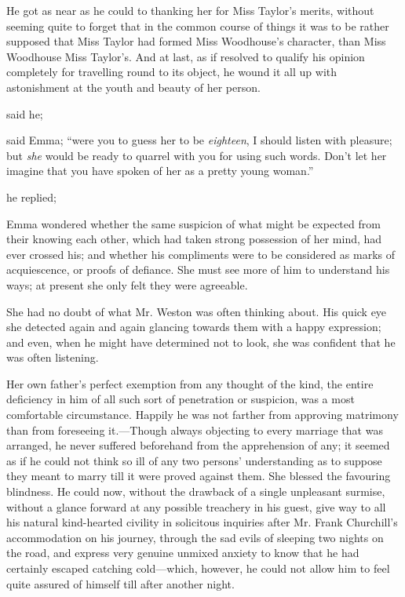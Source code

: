 He got as near as he could to thanking her for Miss Taylor's merits, without seeming quite to forget that in the common course of things it was to be rather supposed that Miss Taylor had formed Miss Woodhouse's character, than Miss Woodhouse Miss Taylor's. And at last, as if resolved to qualify his opinion completely for travelling round to its object, he wound it all up with astonishment at the youth and beauty of her person.

 said he; 

 said Emma; “were you to guess her to be {\em eighteen}, I should listen with pleasure; but {\em she} would be ready to quarrel with you for using such words. Don't let her imagine that you have spoken of her as a pretty young woman.”

 he replied; 

Emma wondered whether the same suspicion of what might be expected from their knowing each other, which had taken strong possession of her mind, had ever crossed his; and whether his compliments were to be considered as marks of acquiescence, or proofs of defiance. She must see more of him to understand his ways; at present she only felt they were agreeable.

She had no doubt of what Mr. Weston was often thinking about. His quick eye she detected again and again glancing towards them with a happy expression; and even, when he might have determined not to look, she was confident that he was often listening.

Her own father's perfect exemption from any thought of the kind, the entire deficiency in him of all such sort of penetration or suspicion, was a most comfortable circumstance. Happily he was not farther from approving matrimony than from foreseeing it.---Though always objecting to every marriage that was arranged, he never suffered beforehand from the apprehension of any; it seemed as if he could not think so ill of any two persons' understanding as to suppose they meant to marry till it were proved against them. She blessed the favouring blindness. He could now, without the drawback of a single unpleasant surmise, without a glance forward at any possible treachery in his guest, give way to all his natural kind-hearted civility in solicitous inquiries after Mr. Frank Churchill's accommodation on his journey, through the sad evils of sleeping two nights on the road, and express very genuine unmixed anxiety to know that he had certainly escaped catching cold---which, however, he could not allow him to feel quite assured of himself till after another night.

